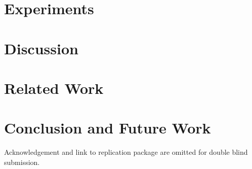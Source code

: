 \documentclass[sigconf]{acmart}
\begin{document}
\section{Experiments}\label{sec.exp}


\section{Discussion}\label{sec.discuss}


\section{Related Work}\label{sec.related}


\section{Conclusion and Future Work}\label{sec.conclusion}


\vspace{0.2cm} Acknowledgement and link to replication package are omitted for double blind submission.

\balance


\end{document}
